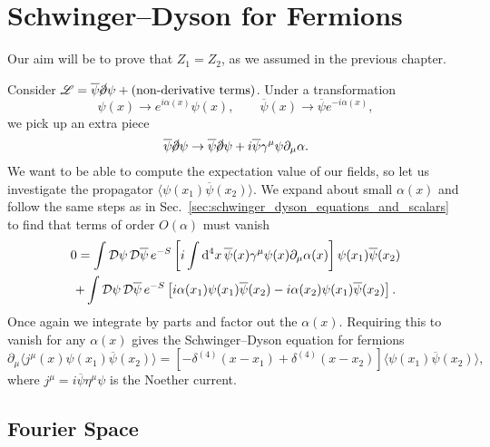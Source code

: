 \section{Schwinger--Dyson for Fermions}%
\label{sec:schwinger_dyson_for_fermions}

Our aim will be to prove that $Z_1 = Z_2$, as we assumed in the previous chapter.

Consider $\mathscr{L} = \overline{\psi}{} \cancel{\partial} \psi + (\text{non-derivative terms})$.
Under a transformation
\begin{equation}
  \psi(x) \to e^{i \alpha(x)} \psi(x), \qquad \overline{\psi}{}(x) \to \overline{\psi}{} e^{-i \alpha(x)},
\end{equation}
we pick up an extra piece
\begin{equation}
  \overline{\psi}{} \cancel{\partial} \psi \to \overline{\psi}{}\cancel{\partial} \psi + i \overline{\psi}{} \gamma^{\mu} \psi \partial_{\mu} \alpha.
\end{equation}
We want to be able to compute the expectation value of our fields, so let us investigate the propagator $\langle \psi(x_1) \overline{\psi}{}(x_2) \rangle$.
We expand about small $\alpha(x)$ and follow the same steps as in Sec.~\ref{sec:schwinger_dyson_equations_and_scalars} to find that terms of order $O(\alpha)$ must vanish
\begin{multline}
  0 = \int \mathop{\mathcal{D} \psi} \mathop{\mathcal{D} \overline{\psi}{}} e^{-S} \left[ i \int \dd[4]{x} \overline{\psi}{}(x) \gamma^{\mu} \psi(x) \partial_{\mu} \alpha(x) \right] \psi(x_1) \overline{\psi}{}(x_2) \\
  + \int \mathop{\mathcal{D} \psi} \mathop{\mathcal{D} \overline{\psi}{}} e^{-S} \left[ i \alpha(x_1) \psi(x_1) \overline{\psi}{}(x_2) - i \alpha(x_2) \psi(x_1) \overline{\psi}{}(x_2) \right].
\end{multline}
Once again we integrate by parts and factor out the $\alpha(x)$. Requiring this to vanish for any $\alpha(x)$ gives the Schwinger--Dyson equation for fermions
\begin{equation}
  \partial_{\mu} \langle j^{\mu}(x) \psi(x_1) \overline{\psi}{}(x_2) \rangle = \left[ - \delta^{(4)}(x - x_1) + \delta^{(4)}(x - x_2) \right] \langle \psi(x_1) \overline{\psi}{}(x_2) \rangle,
\end{equation}
where $j^{\mu} = i \overline{\psi}{} \eta^{\mu} \psi$ is the Noether current.

\subsection*{Fourier Space}%

